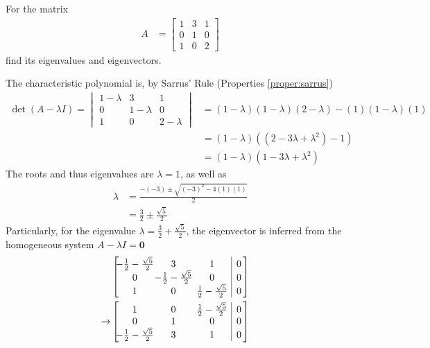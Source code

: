 \begin{exmp}
\label{exmp:eigenfull}
For the matrix
\begin{align*}
A &= 
\begin{bmatrix}
1 & 3 & 1 \\
0 & 1 & 0 \\
1 & 0 & 2
\end{bmatrix}
\end{align*}
find its eigenvalues and eigenvectors.
\end{exmp}
\begin{solution}
The characteristic polynomial is, by Sarrus' Rule (Properties \ref{proper:sarrus})
\begin{align*}
\det(A-\lambda I) = \begin{vmatrix}
1-\lambda & 3 & 1 \\
0 & 1-\lambda & 0 \\
1 & 0 & 2-\lambda 
\end{vmatrix} &=
(1-\lambda)(1-\lambda)(2-\lambda) - (1)(1-\lambda)(1) \\
&= (1-\lambda)((2-3\lambda+\lambda^2) - 1) \\
&= (1-\lambda)(1-3\lambda+\lambda^2)
\end{align*}
The roots and thus eigenvalues are $\lambda = 1$, as well as
\begin{align*}
\lambda &= \frac{-(-3) \pm \sqrt{(-3)^2 - 4(1)(1)}}{2} \\
&= \frac{3}{2} \pm \frac{\sqrt{5}}{2}
\end{align*}
Particularly, for the eigenvalue $\lambda = \frac{3}{2} + \frac{\sqrt{5}}{2}$, the eigenvector is inferred from the homogeneous system $A - \lambda I = \textbf{0}$
\begin{align*}
& \left[\begin{array}{@{\,}wc{30pt}wc{30pt}wc{30pt}|c@{\,}}
-\frac{1}{2}-\frac{\sqrt{5}}{2} & 3 & 1 & 0 \\
0 & -\frac{1}{2}-\frac{\sqrt{5}}{2} & 0 & 0 \\
1 & 0 & \frac{1}{2}-\frac{\sqrt{5}}{2} & 0
\end{array}\right] \\
\to&
\left[\begin{array}{@{\,}wc{30pt}wc{30pt}wc{30pt}|c@{\,}}
1 & 0 & \frac{1}{2}-\frac{\sqrt{5}}{2} & 0 \\
0 & 1 & 0 & 0 \\
-\frac{1}{2}-\frac{\sqrt{5}}{2} & 3 & 1 & 0
\end{array}\right] & \begin{aligned}

\end{aligned}
\end{align*}
\end{solution}
